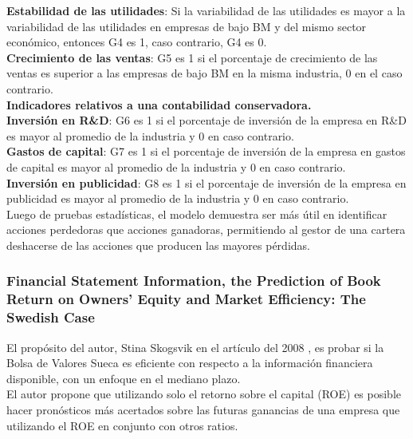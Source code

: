 \textbf{Estabilidad de las utilidades}: Si la variabilidad de las utilidades es mayor a la variabilidad de las utilidades en empresas de bajo BM y del mismo sector económico, entonces G4 es 1, caso contrario, G4 es 0.\\

\textbf{Crecimiento de las ventas}: G5 es 1 si el porcentaje de crecimiento de las ventas es superior a las empresas de bajo BM en la misma industria, 0 en el caso contrario.\\

\textbf{Indicadores relativos a una contabilidad conservadora.}\\

\textbf{Inversión en R\&D}: G6 es 1 si el porcentaje de inversión de la empresa en R\&D es mayor al promedio de la industria y 0 en caso contrario.\\

\textbf{Gastos de capital}: G7 es 1 si el porcentaje de inversión de la empresa en gastos de capital es mayor al promedio de la industria y 0 en caso contrario.\\

\textbf{Inversión en publicidad}: G8 es 1 si el porcentaje de inversión de la empresa en publicidad es mayor al promedio de la industria y 0 en caso contrario.\\

Luego de pruebas estadísticas, el modelo demuestra ser más útil en identificar acciones perdedoras que acciones ganadoras, permitiendo al gestor de una cartera deshacerse de las acciones que producen las mayores pérdidas.\\

\subsubsection{Financial Statement Information, the Prediction of Book Return on Owners’ Equity and Market Efficiency: The Swedish Case}

El propósito del autor, Stina Skogsvik en el artículo del 2008 \cite{Skogsvik2008}, es probar si la Bolsa de Valores Sueca es eficiente con respecto a la información financiera disponible, con un enfoque en el mediano plazo.\\

El autor propone que utilizando solo el retorno sobre el capital (ROE) es posible hacer pronósticos más acertados sobre las futuras ganancias de una empresa que utilizando el ROE en conjunto con otros ratios.\\

